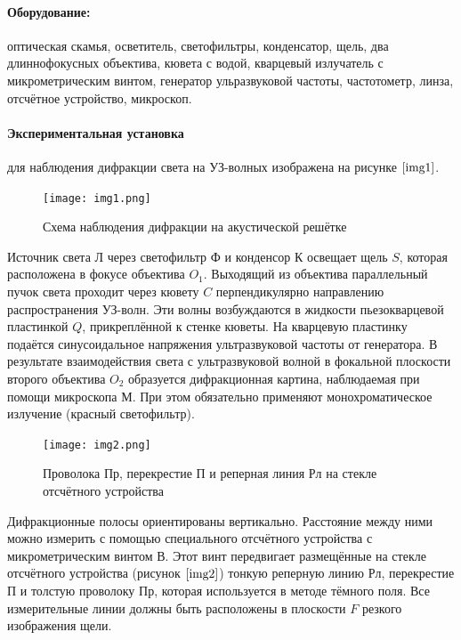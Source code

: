 \documentclass[a4paper,12pt]{article} %
\begin{document}
\paragraph{Оборудование:} оптическая скамья, осветитель, светофильтры, конденсатор, щель, два длиннофокусных объектива, кювета с водой, кварцевый излучатель с микрометрическим винтом, генератор ульразвуковой частоты, частотометр, линза, отсчётное устройство, микроскоп.

\paragraph{Экспериментальная установка} для наблюдения дифракции света на УЗ-волных изображена на рисунке $\ref{img1}$.

\begin{figure}[h]
    \begin{center}
        \texttt{[image: img1.png]}
    \end{center}
    \caption{Схема наблюдения дифракции на акустической решётке}
    \label{img1}
\end{figure}

Источник света $\text{Л}$ через светофильтр $\text{Ф}$ и конденсор $\text{К}$ освещает щель $S$, которая расположена в фокусе объектива $O_1$. Выходящий из объектива параллельный пучок света проходит через кювету $C$ перпендикулярно направлению распространения УЗ-волн. Эти волны возбуждаются в жидкости пьезокварцевой пластинкой $Q$, прикреплённой к стенке кюветы. На кварцевую пластинку подаётся синусоидальное напряжения ультразвуковой частоты от генератора. В результате взаимодействия света с ультразвуковой волной в фокальной плоскости второго объектива $O_2$ образуется дифракционная картина, наблюдаемая при помощи микроскопа М. При этом обязательно применяют монохроматическое излучение (красный светофильтр).

\begin{figure} 
    \texttt{[image: img2.png]}
    \caption{Проволока $\text{Пр}$, перекрестие $\text{П}$ и реперная линия $\text{Рл}$ на стекле отсчётного устройства}
    \label{img2}
\end{figure}

Дифракционные полосы ориентированы вертикально. Расстояние между ними можно измерить с помощью специального отсчётного устройства с микрометрическим винтом $\text{В}$. Этот винт передвигает размещённые на стекле отсчётного устройства (рисунок $\ref{img2}$) тонкую реперную линию $\text{Рл}$, перекрестие $\text{П}$ и толстую проволоку $\text{Пр}$, которая используется в методе тёмного поля. Все измерительные линии должны быть расположены в плоскости $F$ резкого изображения щели.
\end{document}
